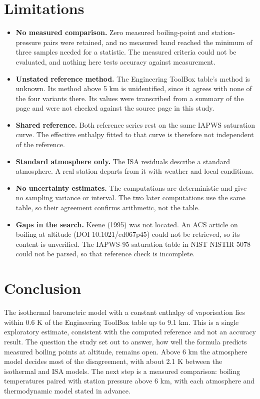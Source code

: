 \documentclass[11pt,letterpaper]{article}
\begin{document}
\section{Limitations}\label{sec:limitations}

\begin{itemize}
  \item \textbf{No measured comparison.} Zero measured boiling-point and station-pressure pairs were retained, and no measured band reached the minimum of three samples needed for a statistic. The measured criteria could not be evaluated, and nothing here tests accuracy against measurement.
  \item \textbf{Unstated reference method.} The Engineering ToolBox table's method is unknown. Its method above 5 km is unidentified, since it agrees with none of the four variants there. Its values were transcribed from a summary of the page and were not checked against the source page in this study.
  \item \textbf{Shared reference.} Both reference series rest on the same IAPWS saturation curve. The effective enthalpy fitted to that curve is therefore not independent of the reference.
  \item \textbf{Standard atmosphere only.} The ISA residuals describe a standard atmosphere. A real station departs from it with weather and local conditions.
  \item \textbf{No uncertainty estimates.} The computations are deterministic and give no sampling variance or interval. The two later computations use the same table, so their agreement confirms arithmetic, not the table.
  \item \textbf{Gaps in the search.} Keene (1995) was not located. An ACS article on boiling at altitude (DOI 10.1021/ed067p45) could not be retrieved, so its content is unverified. The IAPWS-95 saturation table in NIST NISTIR 5078 could not be parsed, so that reference check is incomplete.
\end{itemize}

\section{Conclusion}\label{sec:conclusion}

The isothermal barometric model with a constant enthalpy of vaporisation lies within 0.6 K of the Engineering ToolBox table up to 9.1 km. This is a single exploratory estimate, consistent with the computed reference and not an accuracy result. The question the study set out to answer, how well the formula predicts measured boiling points at altitude, remains open. Above 6 km the atmosphere model decides most of the disagreement, with about 2.1 K between the isothermal and ISA models. The next step is a measured comparison: boiling temperatures paired with station pressure above 6 km, with each atmosphere and thermodynamic model stated in advance.
\end{document}
